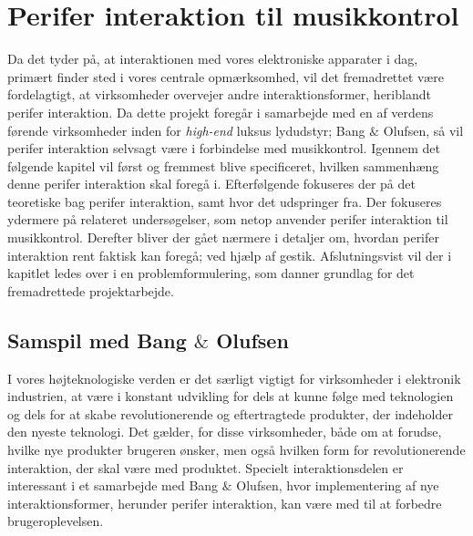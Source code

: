 \chapter{Perifer interaktion til musikkontrol}
\label{PeriferInteraktionTilMusikKontrol}
%
Da det tyder på, at interaktionen med vores elektroniske apparater i dag, primært finder sted i vores centrale opmærksomhed, vil det fremadrettet være fordelagtigt, at virksomheder overvejer andre interaktionsformer, heriblandt perifer interaktion. Da dette projekt foregår i samarbejde med en af verdens førende virksomheder inden for \textit{high-end} luksus lydudstyr; Bang $\&$ Olufsen, så vil perifer interaktion selvsagt være i forbindelse med musikkontrol. Igennem det følgende kapitel vil først og fremmest blive specificeret, hvilken sammenhæng denne perifer interaktion skal foregå i. Efterfølgende fokuseres der på det teoretiske bag perifer interaktion, samt hvor det udspringer fra. Der fokuseres ydermere på relateret undersøgelser, som netop anvender perifer interaktion til musikkontrol. Derefter bliver der gået nærmere i detaljer om, hvordan perifer interaktion rent faktisk kan foregå; ved hjælp af gestik. Afslutningsvist vil der i kapitlet ledes over i en problemformulering, som danner grundlag for det fremadrettede projektarbejde.    
%
\section{Samspil med Bang $\&$ Olufsen}
\label{SamspilMedBO}
%
I vores højteknologiske verden er det særligt vigtigt for virksomheder i elektronik industrien, at være i konstant udvikling for dels at kunne følge med teknologien og dels for at skabe revolutionerende og eftertragtede produkter, der indeholder den nyeste teknologi. Det gælder, for disse virksomheder, både om at forudse, hvilke nye produkter brugeren ønsker, men også hvilken form for revolutionerende interaktion, der skal være med produktet. Specielt interaktionsdelen er interessant i et samarbejde med Bang $\&$ Olufsen, hvor implementering af nye interaktionsformer, herunder perifer interaktion, kan være med til at forbedre brugeroplevelsen.

